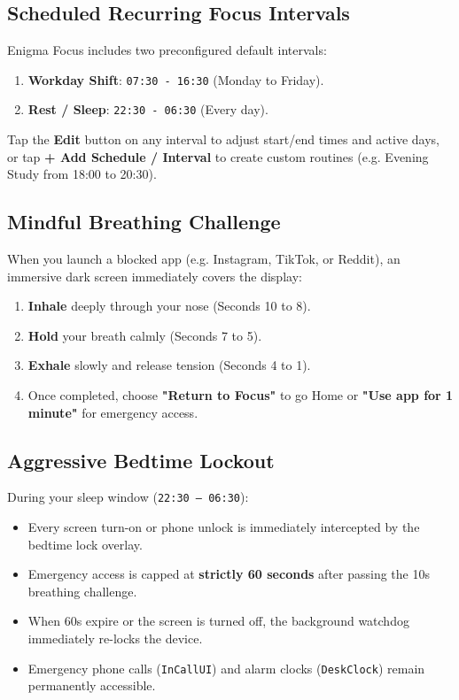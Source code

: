 \documentclass[11pt,a4paper]{article}
\begin{document}
\subsection{Scheduled Recurring Focus Intervals}
Enigma Focus includes two preconfigured default intervals:
\begin{enumerate}
    \item \textbf{Workday Shift}: \texttt{07:30 - 16:30} (Monday to Friday).
    \item \textbf{Rest / Sleep}: \texttt{22:30 - 06:30} (Every day).
\end{enumerate}
Tap the \textbf{Edit} button on any interval to adjust start/end times and active days, or tap \textbf{+ Add Schedule / Interval} to create custom routines (e.g. Evening Study from 18:00 to 20:30).

\subsection{Mindful Breathing Challenge}
When you launch a blocked app (e.g. Instagram, TikTok, or Reddit), an immersive dark screen immediately covers the display:
\begin{enumerate}
    \item \textbf{Inhale} deeply through your nose (Seconds 10 to 8).
    \item \textbf{Hold} your breath calmly (Seconds 7 to 5).
    \item \textbf{Exhale} slowly and release tension (Seconds 4 to 1).
    \item Once completed, choose \textbf{"Return to Focus"} to go Home or \textbf{"Use app for 1 minute"} for emergency access.
\end{enumerate}

\subsection{Aggressive Bedtime Lockout}
During your sleep window (\texttt{22:30 -- 06:30}):
\begin{itemize}
    \item Every screen turn-on or phone unlock is immediately intercepted by the bedtime lock overlay.
    \item Emergency access is capped at \textbf{strictly 60 seconds} after passing the 10s breathing challenge.
    \item When 60s expire or the screen is turned off, the background watchdog immediately re-locks the device.
    \item Emergency phone calls (\texttt{InCallUI}) and alarm clocks (\texttt{DeskClock}) remain permanently accessible.
\end{itemize}
\end{document}
